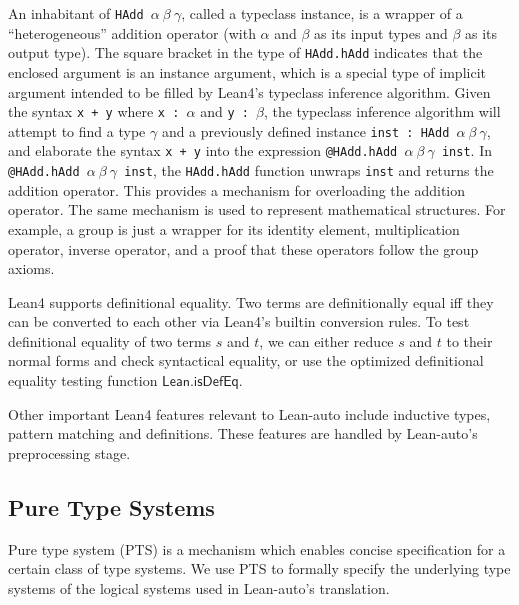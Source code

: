   \noindent An inhabitant of \texttt{HAdd $\alpha \ \beta \ \gamma$}, called a
  typeclass instance, is a wrapper of a ``heterogeneous'' addition operator (with $\alpha$ and $\beta$ as its input types and
  $\beta$ as its output type). The square bracket in the type of \texttt{HAdd.hAdd}
  indicates that the enclosed argument is an instance argument, which is a special type
  of implicit argument intended to be filled by Lean4's typeclass inference algorithm.
  Given the syntax \texttt{x + y} where \texttt{x : $\alpha$} and \texttt{y : $\beta$},
  the typeclass inference algorithm will attempt to find a type $\gamma$ and a previously
  defined instance \texttt{inst : HAdd $\alpha \ \beta \ \gamma$}, and elaborate the
  syntax \texttt{x + y} into the expression \texttt{@HAdd.hAdd $\alpha \ \beta \ \gamma$ inst}.
  In \texttt{@HAdd.hAdd $\alpha \ \beta \ \gamma$ inst}, the \texttt{HAdd.hAdd} function
  unwraps \texttt{inst} and returns the addition operator. This provides a mechanism
  for overloading the addition operator. The same mechanism is used to represent mathematical
  structures. For example, a group is just a wrapper for its identity element, multiplication
  operator, inverse operator, and a proof that these operators follow the group axioms.

  Lean4 supports definitional equality. Two terms are definitionally equal
  iff they can be converted to each other via Lean4's builtin conversion rules.
  To test definitional equality of two terms $s$ and $t$, we can either reduce $s$ and
  $t$ to their normal forms and check syntactical equality, or use the optimized definitional
  equality testing function $\mathsf{Lean.isDefEq}$.

  Other important Lean4 features relevant to Lean-auto include inductive types, pattern matching and definitions.
  These features are handled by Lean-auto's preprocessing stage.

\subsection{Pure Type Systems}\label{sectpts}

  Pure type system (PTS) \cite{LambdaWithType} is a mechanism which enables concise specification
  for a certain class of type systems. We use PTS to formally specify the underlying type systems
  of the logical systems used in Lean-auto's translation.

